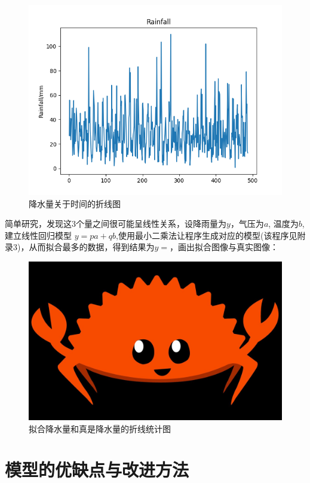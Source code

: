 \documentclass[UTF8]{ctexart}
\begin{document}
  \begin{figure}[htbp]
	\centering
	\includegraphics[scale=0.5]{rr.png}
	\caption{降水量关于时间的折线图}
\end{figure}

简单研究，发现这3个量之间很可能呈线性关系，设降雨量为$y$，气压为$a$, 温度为$b$, 建立线性回归模型 $y=pa+qb$,使用最小二乘法让程序生成对应的模型(该程序见附录3)，从而拟合最多的数据，得到结果为$y=$，画出拟合图像与真实图像：

\begin{figure}[htbp]
	\centering
	\includegraphics[scale=0.1]{rust.jpg}
	\caption{拟合降水量和真是降水量的折线统计图}
\end{figure}

  \section{模型的优缺点与改进方法}
\end{document}
